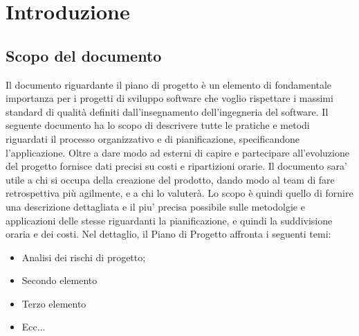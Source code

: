 

\section{Introduzione}
\subsection{Scopo del documento}
Il documento riguardante il piano di progetto è un elemento di fondamentale importanza per
i progetti di sviluppo software che voglio rispettare i massimi standard di qualità definiti dall’insegnamento dell’ingegneria del software.
Il seguente documento ha lo scopo di descrivere tutte le pratiche e metodi riguardati il processo
organizzativo e di pianificazione, specificandone l’applicazione.
Oltre a dare modo ad esterni di capire e partecipare all’evoluzione del progetto fornisce dati
precisi su costi e ripartizioni orarie.
Il documento sara’ utile a chi si occupa della creazione del prodotto, dando modo al team di
fare retrospettiva più agilmente, e a chi lo valuterà.
Lo scopo è quindi quello di fornire una descrizione dettagliata e il piu’ precisa possibile sulle
metodolgie e applicazioni delle stesse riguardanti la pianificazione, e quindi la suddivisione oraria e dei costi.
Nel dettaglio, il Piano di Progetto affronta i seguenti temi:
\begin{itemize}
    \item Analisi dei rischi di progetto;
    \item Secondo elemento
    \item Terzo elemento
    \item Ecc...
\end{itemize}

